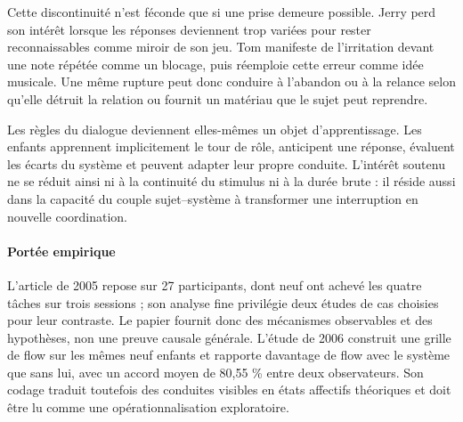\documentclass[10pt,a4paper]{article}
\begin{document}
Cette discontinuité n'est féconde que si une prise demeure possible. Jerry perd son intérêt lorsque les réponses deviennent trop variées pour rester reconnaissables comme miroir de son jeu. Tom manifeste de l'irritation devant une note répétée comme un blocage, puis réemploie cette erreur comme idée musicale. Une même rupture peut donc conduire à l'abandon ou à la relance selon qu'elle détruit la relation ou fournit un matériau que le sujet peut reprendre.

Les règles du dialogue deviennent elles-mêmes un objet d'apprentissage. Les enfants apprennent implicitement le tour de rôle, anticipent une réponse, évaluent les écarts du système et peuvent adapter leur propre conduite. L'intérêt soutenu ne se réduit ainsi ni à la continuité du stimulus ni à la durée brute : il réside aussi dans la capacité du couple sujet--système à transformer une interruption en nouvelle coordination.

\paragraph{Portée empirique}
L'article de 2005 repose sur 27 participants, dont neuf ont achevé les quatre tâches sur trois sessions ; son analyse fine privilégie deux études de cas choisies pour leur contraste. Le papier fournit donc des mécanismes observables et des hypothèses, non une preuve causale générale. L'étude de 2006 construit une grille de flow sur les mêmes neuf enfants et rapporte davantage de flow avec le système que sans lui, avec un accord moyen de 80,55 \% entre deux observateurs. Son codage traduit toutefois des conduites visibles en états affectifs théoriques et doit être lu comme une opérationnalisation exploratoire.
\end{document}

